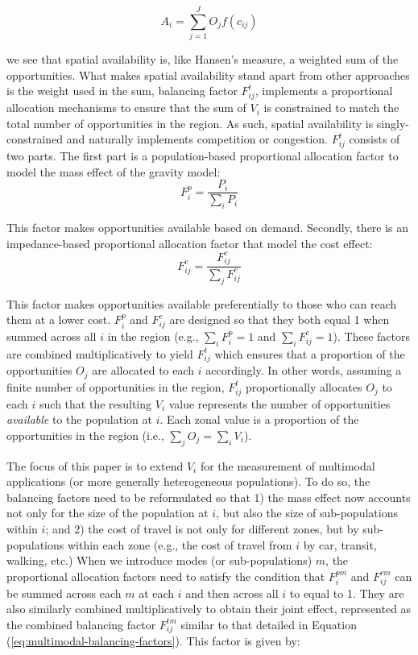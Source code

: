 \documentclass[10pt,letterpaper]{article}
\begin{document}
\begin{equation}
\label{eq:hansen-accessibility}
A_i = \sum_{j=1}^J O_jf(c_{ij})
\end{equation}

\noindent we see that spatial availability is, like Hansen's measure, a
weighted sum of the opportunities. What makes spatial availability stand
apart from other approaches is the weight used in the sum, balancing
factor \(F^t_{ij}\), implements a proportional allocation mechanisms to
ensure that the sum of \(V_i\) is constrained to match the total number
of opportunities in the region. As such, spatial availability is
singly-constrained and naturally implements competition or congestion.
\(F^t_{ij}\) consists of two parts. The first part is a population-based
proportional allocation factor to model the mass effect of the gravity
model: \[
F^p_{i} = \frac{P_i}{\sum_i P_i}
\]

This factor makes opportunities available based on demand. Secondly,
there is an impedance-based proportional allocation factor that model
the cost effect: \[
F^c_{ij} = \frac{F^c_{ij}}{\sum_j F^c_{ij}}
\]

This factor makes opportunities available preferentially to those who
can reach them at a lower cost. \(F^p_{i}\) and \(F^c_{ij}\) are
designed so that they both equal 1 when summed across all \(i\) in the
region (e.g., \(\sum_i F^p_{i} = 1\) and \(\sum_i F^c_{ij} = 1\)). These
factors are combined multiplicatively to yield \(F^t_{ij}\) which
ensures that a proportion of the opportunities \(O_j\) are allocated to
each \(i\) accordingly. In other words, assuming a finite number of
opportunities in the region, \(F^t_{ij}\) proportionally allocates
\(O_j\) to each \(i\) such that the resulting \(V_i\) value represents
the number of opportunities \emph{available} to the population at \(i\).
Each zonal value is a proportion of the opportunities in the region
(i.e., \(\sum_j O_j = \sum_i V_i\)).

The focus of this paper is to extend \(V_i\) for the measurement of
multimodal applications (or more generally heterogeneous populations).
To do so, the balancing factors need to be reformulated so that 1) the
mass effect now accounts not only for the size of the population at
\(i\), but also the size of sub-populations within \(i\); and 2) the
cost of travel is not only for different zones, but by sub-populations
within each zone (e.g., the cost of travel from \(i\) by car, transit,
walking, etc.) When we introduce modes (or sub-populations) \(m\), the
proportional allocation factors need to satisfy the condition that
\(F^{pm}_{i}\) and \(F^{cm}_{ij}\) can be summed across each \(m\) at
each \(i\) and then across all \(i\) to equal to 1. They are also
similarly combined multiplicatively to obtain their joint effect,
represented as the combined balancing factor \(F^{tm}_{ij}\) similar to
that detailed in Equation (\ref{eq:multimodal-balancing-factors}). This
factor is given by:
\end{document}
